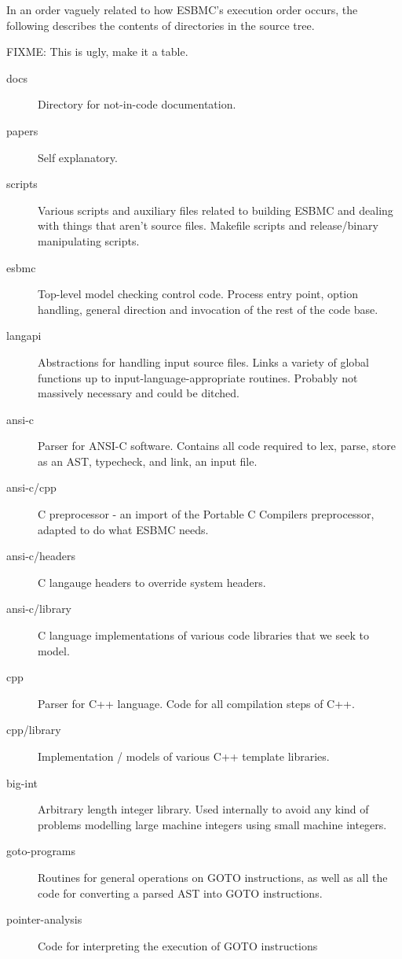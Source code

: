 \documentclass{article}
\begin{document}
In an order vaguely related to how ESBMC's execution order occurs, the
following describes the contents of directories in the source tree.

FIXME: This is ugly, make it a table.

\begin{description}
\item[docs] Directory for not-in-code documentation.
\item[papers] Self explanatory.
\item[scripts] Various scripts and auxiliary files related to building ESBMC
               and dealing with things that aren't source files. Makefile
               scripts and release/binary manipulating scripts.
\item[esbmc] Top-level model checking control code. Process entry point,
             option handling, general direction and invocation of the rest
             of the code base.
\item[langapi] Abstractions for handling input source files. Links a variety
               of global functions up to input-language-appropriate routines.
               Probably not massively necessary and could be ditched.
\item[ansi-c] Parser for ANSI-C software. Contains all code required to lex,
              parse, store as an AST, typecheck, and link, an input file.
\item[ansi-c/cpp] C preprocessor - an import of the Portable C Compilers
                  preprocessor, adapted to do what ESBMC needs.
\item[ansi-c/headers] C langauge headers to override system headers.
\item[ansi-c/library] C language implementations of various code libraries
                      that we seek to model.
\item[cpp] Parser for C++ language. Code for all compilation steps of C++.
\item[cpp/library] Implementation / models of various C++ template libraries.
\item[big-int] Arbitrary length integer library. Used internally to avoid any
               kind of problems modelling large machine integers using small
               machine integers.
\item[goto-programs] Routines for general operations on GOTO instructions, as
                     well as all the code for converting a parsed AST into
                     GOTO instructions.
\item[pointer-analysis] Code for interpreting the execution of GOTO instructions

\end{description}
\end{document}
